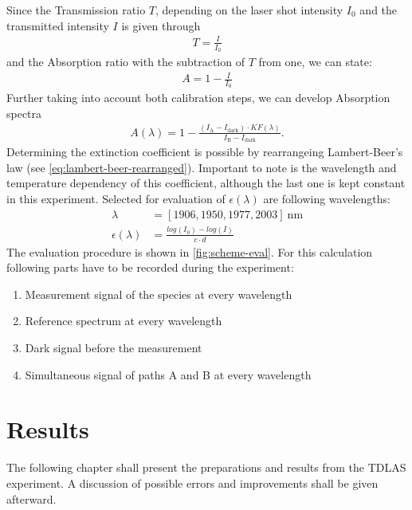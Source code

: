 Since the Transmission ratio $T$, depending on the laser shot intensity $I_\mathrm{0}$ and the transmitted intensity $I$ is given through 
\begin{align}
    T=\frac{I}{I_\mathrm{0}} \nonumber
\end{align}
and the Absorption ratio with the subtraction of $T$ from one, we can state:
\begin{align}
    A=1-\frac{I}{I_\mathrm{0}} \nonumber
\end{align}
Further taking into account both calibration steps, we can develop Absorption spectra
\begin{align}
    A(\lambda)=1-\frac{(I_\mathrm{A} - I_\mathrm{dark}) \cdot KF(\lambda)}{I_\mathrm{B} - I_\mathrm{dark}} \label{eq:absorption-spectrum}.
\end{align}
Determining the extinction coefficient is possible by rearrangeing Lambert-Beer's law (see \autoref{eq:lambert-beer-rearranged}). Important to note is the wavelength and temperature dependency of this coefficient, although the last one is kept constant in this experiment. Selected for evaluation of $\epsilon(\lambda)$ are following wavelengths:
\begin{align}
    \lambda&=[1906, 1950, 1977, 2003]~\mathrm{nm} \nonumber \\[6pt]
    \epsilon(\lambda)&=\frac{log(I_\mathrm{0})-log(I)}{c \cdot d} \label{eq:lambert-beer-rearranged}
\end{align}
The evaluation procedure is shown in \autoref{fig:scheme-eval}. For this calculation following parts have to be recorded during the experiment:
\begin{enumerate}
    \item Measurement signal of the species at every wavelength
    \item Reference spectrum at every wavelength
    \item Dark signal before the measurement
    \item Simultaneous signal of paths A and B at every wavelength
\end{enumerate}

\chapter{Results}
\label{chap:results}

The following chapter shall present the preparations and results from the TDLAS experiment. A discussion of possible errors and improvements shall be given afterward.

